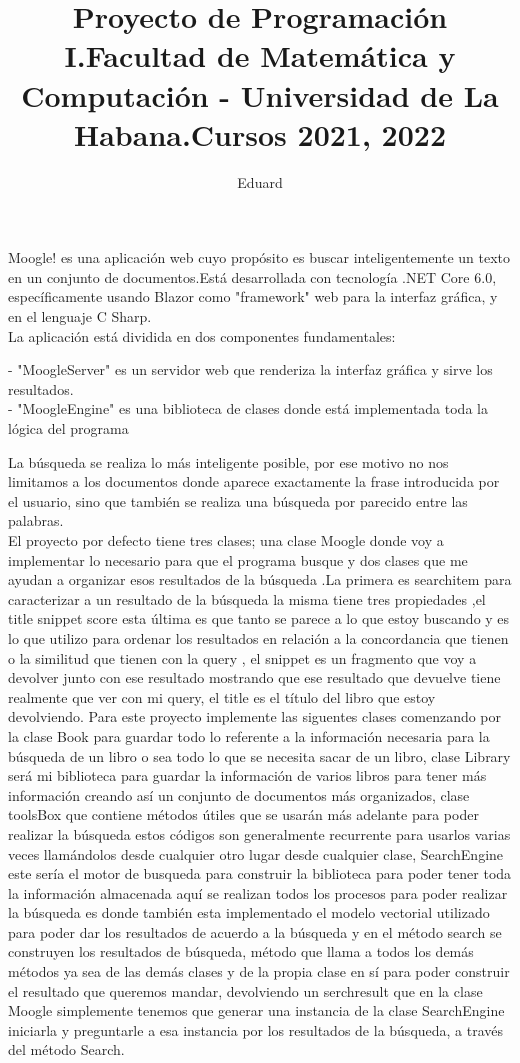 \documentclass[a4paper,12pt]{article}
\author{Eduard}
\title{Proyecto de Programación I.Facultad de Matemática y Computación - Universidad de La Habana.Cursos 2021, 2022}
\begin{document}
\maketitle
Moogle! es una aplicaci\'on web cuyo prop\'osito es buscar inteligentemente un
texto en un conjunto de documentos.Est\'a desarrollada con tecnolog\'ia .NET Core 6.0,
específicamente usando Blazor como "framework" web para la interfaz gr\'afica, y en el lenguaje C Sharp.\\
 La aplicación está dividida en dos componentes fundamentales:

- "MoogleServer" es un servidor web que renderiza la interfaz gr\'afica y sirve los resultados.\\
- "MoogleEngine" es una biblioteca de clases donde está implementada toda la l\'ogica del programa

La b\'usqueda se realiza lo m\'as inteligente posible, por ese motivo no nos limitamos a 
los documentos donde aparece exactamente la frase introducida por el usuario, sino que tambi\'en se realiza una b\'usqueda por parecido entre las palabras.\\
 

El proyecto por defecto tiene tres clases; una clase Moogle donde voy a implementar lo necesario para
que el programa busque y dos clases que me ayudan a organizar esos resultados de la búsqueda .La
primera es searchitem para caracterizar a un resultado de la búsqueda la misma tiene tres
propiedades ,el title snippet score esta última es que tanto se parece a lo que estoy buscando y es lo que 
utilizo para ordenar los resultados en relación a la concordancia que tienen o la similitud que tienen con
la query , el snippet es un fragmento que voy a devolver junto con ese resultado mostrando que ese
resultado que devuelve tiene realmente que ver con mi query, el title es el título del libro que estoy
devolviendo.
Para este proyecto implemente las siguentes clases comenzando por la clase Book  para guardar todo lo
referente a la información necesaria para la búsqueda de un libro o sea todo lo que se necesita sacar de
un libro, clase Library será mi biblioteca para guardar la información de varios libros para tener más
información creando así un conjunto de documentos más organizados, clase toolsBox que contiene
métodos útiles que se usarán más adelante para poder realizar la búsqueda estos códigos son
generalmente recurrente para usarlos varias veces llamándolos desde cualquier otro lugar desde
cualquier clase, SearchEngine este sería el motor de busqueda para construir la biblioteca para poder
tener toda la información almacenada aquí se realizan todos los procesos para poder realizar la
búsqueda es donde también esta implementado el modelo vectorial utilizado para poder dar los
resultados de acuerdo a la búsqueda y en el método search se construyen los resultados de búsqueda,
método que llama a todos los demás métodos ya sea de las demás clases y de la propia clase en sí para
poder construir el resultado que queremos mandar, devolviendo un serchresult que en la clase Moogle
simplemente tenemos que generar una instancia de la clase SearchEngine iniciarla y preguntarle a esa
instancia por los resultados de la búsqueda, a través del método Search.\\
\end{document}
